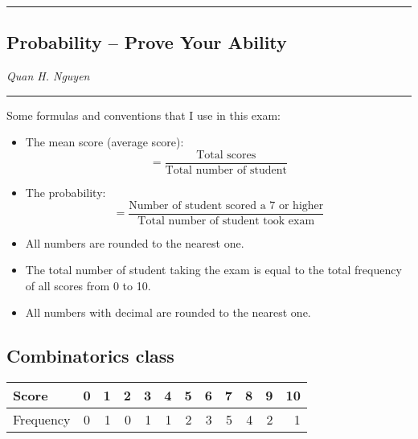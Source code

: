 \documentclass[12pt]{article}
\begin{document}
    
\newpage

\hrule
\vspace{.2mm}
\begin{center}
    \section*{Probability -- Prove Your Ability}
    \textit{Quan H. Nguyen}
\end{center}
\vspace{.2mm}
\hrule


Some formulas and conventions that I use in this exam:
\begin{itemize}
    \item The mean score (average score):
    $$=\frac{\text{Total scores}}{\text{Total number of student}}$$
    \item The probability: 
    $$=\frac{\text{Number of student scored a 7 or higher}}{\text{Total number of student took exam}}$$
    \item All numbers are rounded to the nearest one.
    \item The total number of student taking the exam is equal to the total frequency of all scores from 0 to 10.
    \item All numbers with decimal are rounded to the nearest one.
\end{itemize}


\subsection*{Combinatorics class}
\begin{center}
    \begin{tabular}{l | c*{10}r}
        Score &0 &1 &2 &3 &4 &5 &6 &7 &8 &9 &10 \\
        \hline
        Frequency &0 &1 &0 &1 &1 &2 &3 &5 &4 &2 &1
    \end{tabular}
\end{center}
\end{document}
